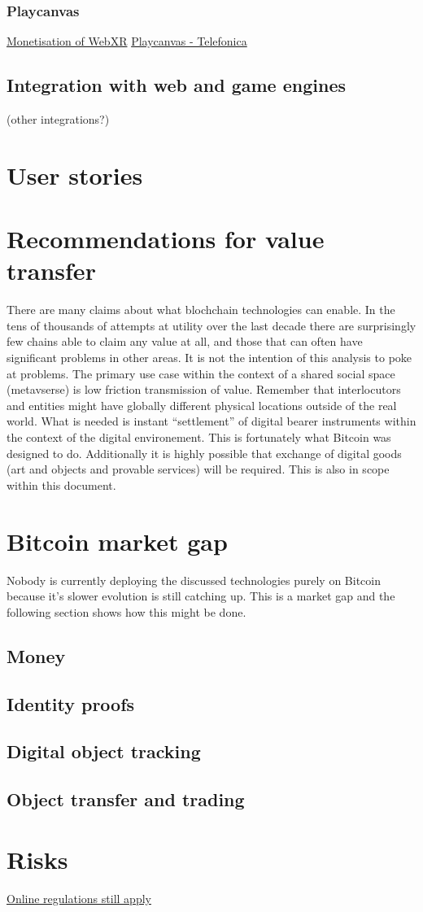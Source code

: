 \subsubsection{Playcanvas}
\href{https://hackmd.io/@XR/monetization}{Monetisation of WebXR}
\href{https://github.com/playcanvas/engine}{Playcanvas - Telefonica}
\subsection{Integration with web and game engines} (other integrations?) 
\section{User stories}
\section{Recommendations for value transfer}
There are many claims about what blochchain technologies can enable. In the tens of thousands of attempts at utility over the last decade there are surprisingly few chains able to claim any value at all, and those that can often have significant problems in other areas. It is not the intention of this analysis to poke at problems. The primary use case within the context of a shared social space (metavserse) is low friction transmission of value. Remember that interlocutors and entities might have globally different physical locations outside of the real world. What is needed is instant ``settlement'' of digital bearer instruments within the context of the digital environement. This is fortunately what Bitcoin was designed to do. Additionally it is highly possible that exchange of digital goods (art and objects and provable services) will be required. This is also in scope within this document.
\section{Bitcoin market gap}
Nobody is currently deploying the discussed technologies purely on Bitcoin because it's slower evolution is still catching up. This is a market gap and the following section shows how this might be done.
\subsection{Money}
\subsection{Identity proofs}
\subsection{Digital object tracking}
\subsection{Object transfer and trading}
\section{Risks}
\href{https://www.carnegieuktrust.org.uk/blog-posts/regulating-the-future-the-online-safety-bill-and-the-metaverse/}{Online regulations still apply}